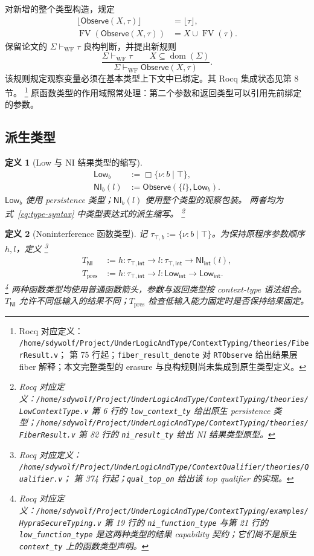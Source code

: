 \documentclass[UTF8,a4paper,11pt,fontset=fandol]{ctexart}
\newcommand{\FV}{\operatorname{FV}}
\newcommand{\dom}{\operatorname{dom}}
\newcommand{\oty}[2]{\{\nu:#1\mid #2\}}
\newcommand{\Observe}{\ensuremath{\mathsf{Observe}}}
\newcommand{\NI}{\mathsf{NI}}
\newcommand{\rocqdefnote}[3]{%
  \footnote{Rocq 对应定义：
  \nolinkurl{/home/sdywolf/Project/UnderLogicAndType/#1}；
  第 #2 行起；#3。}}
\newtheorem{definition}{定义}[section]
\begin{document}
对新增的整个类型构造，规定
\begin{align*}
 \lfloor\Observe(X,\tau)\rfloor&=\lfloor\tau\rfloor,\\
 \FV(\Observe(X,\tau))&=X\cup\FV(\tau).
\end{align*}
保留论文的 $\Sigma\vdash_{\mathrm{WF}}\tau$ 良构判断，并提出新规则
\[
 \frac{\Sigma\vdash_{\mathrm{WF}}\tau\qquad X\subseteq\dom(\Sigma)}
      {\Sigma\vdash_{\mathrm{WF}}\Observe(X,\tau)}.
\]
该规则规定观察变量必须在基本类型上下文中已绑定。其 Rocq 集成状态见第 8 节。
\rocqdefnote{ContextTyping/theories/FiberResult.v}{75}{\texttt{fiber\_result\_denote} 对 \texttt{RTObserve} 给出结果层 fiber 解释；本文完整类型的 erasure 与良构规则尚未集成到原生类型定义}
原函数类型的作用域照常处理：第二个参数和返回类型可以引用先前绑定的参数。

\subsection{派生类型}

\begin{definition}[Low 与 NI 结果类型的缩写]
\begin{align}\label{eq:nitype}
 \mathsf{Low}_b&:=\Box\oty{b}{\top},\\
 \mathsf{NI}_b(l)&:=\Observe(\{l\},\mathsf{Low}_b).
\end{align}
$\mathsf{Low}_b$ 使用 persistence 类型；$\mathsf{NI}_b(l)$ 使用整个类型的观察包装。
两者均为式~\eqref{eq:type-syntax} 中类型表达式的派生缩写。
\footnote{Rocq 对应定义：\nolinkurl{/home/sdywolf/Project/UnderLogicAndType/ContextTyping/theories/LowContextType.v} 第 6 行的 \texttt{low\_context\_ty} 给出原生 persistence 类型；\nolinkurl{/home/sdywolf/Project/UnderLogicAndType/ContextTyping/theories/FiberResult.v} 第 82 行的 \texttt{ni\_result\_ty} 给出 NI 结果类型原型。}
\end{definition}

\begin{definition}[Noninterference 函数类型]
记 $\tau_{\top,b}:=\oty{b}{\top}$。为保持原程序参数顺序 $h,l$，定义
\rocqdefnote{ContextQualifier/theories/Qualifier.v}{374}{\texttt{qual\_top\_on} 给出该 top qualifier 的实现}
\begin{align}\label{eq:fnni}
 T_{\NI}&:=h:\tau_{\top,\mathsf{int}}\to
              l:\tau_{\top,\mathsf{int}}\to\mathsf{NI}_{\mathsf{int}}(l),\\
 T_{\mathrm{pres}}&:=h:\tau_{\top,\mathsf{int}}\to
              l:\mathsf{Low}_{\mathsf{int}}\to\mathsf{Low}_{\mathsf{int}}.
 \label{eq:fnpres}
\end{align}
\footnote{Rocq 对应定义：\nolinkurl{/home/sdywolf/Project/UnderLogicAndType/ContextTyping/examples/HypraSecureTyping.v} 第 19 行的 \texttt{ni\_function\_type} 与第 21 行的 \texttt{low\_function\_type} 是这两种类型的结果 capability 契约；它们尚不是原生 \texttt{context\_ty} 上的函数类型声明。}
两种函数类型均使用普通函数箭头，参数与返回类型按 context-type 语法组合。
$T_{\NI}$ 允许不同低输入的结果不同；$T_{\mathrm{pres}}$ 检查低输入能力固定时是否保持结果固定。
\end{definition}
\end{document}
